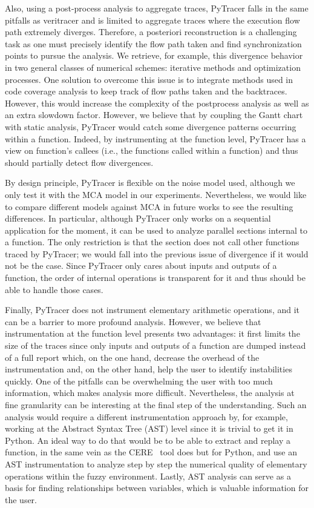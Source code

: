 \documentclass[11pt]{article}
\newcommand{\pytracer}[0]{PyTracer\xspace}
\begin{document}
Also, using a post-process analysis to aggregate traces, \pytracer falls in the same pitfalls as veritracer and is limited to aggregate traces where the execution flow path extremely diverges. Therefore, a posteriori reconstruction
is a challenging task as one must precisely identify the flow path taken and find synchronization points to pursue the analysis. We retrieve, for example, this divergence behavior in two general classes of numerical schemes: iterative methods and optimization processes. One solution to overcome this issue is to integrate methods used in code coverage analysis to keep track of flow paths taken and the backtraces.
However, this would increase the complexity of the postprocess analysis as well as an extra slowdown factor.
However, we believe that by coupling the Gantt chart with static analysis, \pytracer would catch some divergence patterns occurring within a function. Indeed, by instrumenting at the function level, \pytracer has a view on function's callees (i.e., the functions called within a function) and thus should partially detect flow divergences.

By design principle, \pytracer is flexible on the noise model used, although we only test it with the MCA model in our experiments.
Nevertheless, we would like to compare different models against MCA in future works to see the resulting differences. 
In particular, although \pytracer only works on a sequential application for the moment, it can be used to analyze parallel sections internal to a function.
The only restriction is that the section does not call other functions traced by \pytracer; we would fall into the previous issue of divergence if it would not be the case.
Since \pytracer only cares about inputs and outputs of a function, the order of internal operations is transparent for it and thus should be able to handle those cases.

Finally, \pytracer does not instrument elementary arithmetic operations, and it can be a barrier to more profound analysis.
However, we believe that instrumentation at the function level presents two advantages: it first limits the size of the traces since only inputs and outputs of a function are dumped instead of a full report which, on the one hand, decrease the overhead of the instrumentation and, on the other hand, help the user to identify instabilities quickly. One of the pitfalls can be overwhelming the user with too much information, which makes analysis more difficult. Nevertheless, the analysis at fine granularity can be interesting at the final step of the understanding. Such an analysis would require a different instrumentation approach by, for example, working at the Abstract Syntax Tree (AST) level since it is trivial to get it in Python.
An ideal way to do that would be to be able to extract and replay a function, in the same vein as the CERE~\cite{castro2015cere} tool does but for Python, and use an AST instrumentation to analyze step by step 
the numerical quality of elementary operations within the fuzzy environment.
Lastly, AST analysis can serve as a basis for finding relationships between variables, which is valuable information for the user.
\end{document}
